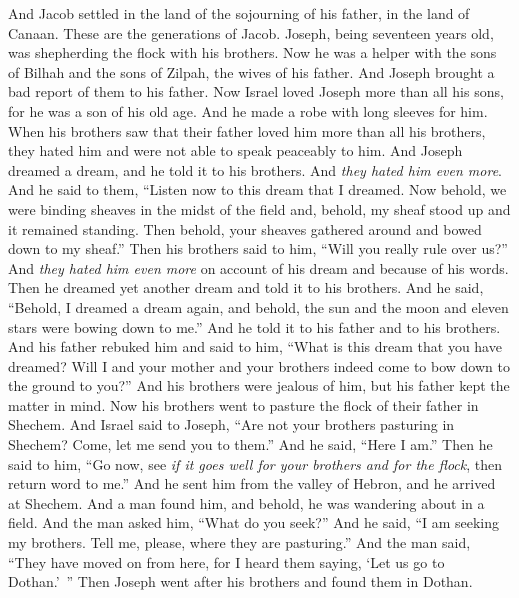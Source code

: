 \begin{biblechapter} %
 And Jacob settled in the land of the sojourning of his father, in the land of Canaan.
\verse These are the generations of Jacob. Joseph, being seventeen years old, was shepherding the flock with his brothers. Now he was a helper with the sons of Bilhah and the sons of Zilpah, the wives of his father. And Joseph brought a bad report of them to his father.
\verse Now Israel loved Joseph more than all his sons, for he was a son of his old age. And he made a robe with long sleeves for him.
\verse When his brothers saw that their father loved him more than all his brothers, they hated him and were not able to speak peaceably to him.
\verse And Joseph dreamed a dream, and he told it to his brothers. And \textit{they hated him even more}.
\verse And he said to them, “Listen now to this dream that I dreamed.
\verse Now behold, we were binding sheaves in the midst of the field and, behold, my sheaf stood up and it remained standing. Then behold, your sheaves gathered around and bowed down to my sheaf.”
\verse Then his brothers said to him, “Will you really rule over us?” And \textit{they hated him even more} on account of his dream and because of his words.
\verse Then he dreamed yet another dream and told it to his brothers. And he said, “Behold, I dreamed a dream again, and behold, the sun and the moon and eleven stars were bowing down to me.”
\verse And he told it to his father and to his brothers. And his father rebuked him and said to him, “What is this dream that you have dreamed? Will I and your mother and your brothers indeed come to bow down to the ground to you?”
\verse And his brothers were jealous of him, but his father kept the matter in mind.
 Now his brothers went to pasture the flock of their father in Shechem.
\verse And Israel said to Joseph, “Are not your brothers pasturing in Shechem? Come, let me send you to them.” And he said, “Here I am.”
\verse Then he said to him, “Go now, see \textit{if it goes well for your brothers and for the flock}, then return word to me.” And he sent him from the valley of Hebron, and he arrived at Shechem.
\verse And a man found him, and behold, he was wandering about in a field. And the man asked him, “What do you seek?”
\verse And he said, “I am seeking my brothers. Tell me, please, where they are pasturing.”
\verse And the man said, “They have moved on from here, for I heard them saying, ‘Let us go to Dothan.’ ” Then Joseph went after his brothers and found them in Dothan.

\end{biblechapter}
